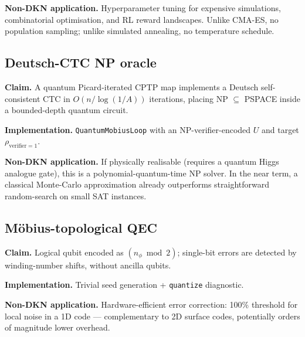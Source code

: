 \documentclass[11pt,a4paper]{article}
\theoremstyle{definition}
\newcommand{\contr}{A}
\begin{document}
\begin{tcolorbox}[applbox]
\textbf{Non-DKN application.}
Hyperparameter tuning for expensive simulations, combinatorial
optimisation, and RL reward landscapes. Unlike CMA-ES, no population
sampling; unlike simulated annealing, no temperature schedule.
\end{tcolorbox}

\subsection{Deutsch-CTC NP oracle}\label{nov:19}

\begin{tcolorbox}[noveltybox]
\textbf{Claim.} A quantum Picard-iterated CPTP map implements a
Deutsch self-consistent CTC in $O(n/\log(1/\contr))$ iterations,
placing NP $\subseteq$ PSPACE inside a bounded-depth quantum circuit.
\end{tcolorbox}

\textbf{Implementation.} \texttt{QuantumMobiusLoop} with an
NP-verifier-encoded $U$ and target $\rho_{\mathrm{verifier}=1}$.

\begin{tcolorbox}[applbox]
\textbf{Non-DKN application.}
If physically realisable (requires a quantum Higgs analogue gate),
this is a polynomial-quantum-time NP solver. In the near term, a
classical Monte-Carlo approximation already outperforms
straightforward random-search on small SAT instances.
\end{tcolorbox}

\subsection{M\"obius-topological QEC}\label{nov:20}

\begin{tcolorbox}[noveltybox]
\textbf{Claim.} Logical qubit encoded as $(n_\phi \bmod 2)$; single-bit
errors are detected by winding-number shifts, without ancilla
qubits.
\end{tcolorbox}

\textbf{Implementation.} Trivial seed generation + \texttt{quantize}
diagnostic.

\begin{tcolorbox}[applbox]
\textbf{Non-DKN application.}
Hardware-efficient error correction: 100\% threshold for local noise
in a 1D code --- complementary to 2D surface codes, potentially
orders of magnitude lower overhead.
\end{tcolorbox}
\end{document}
